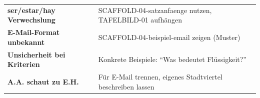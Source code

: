 \documentclass[11pt, a4paper]{article}
\begin{document}
\begin{tcolorbox}[
    colback=white,
    colframe=spanisch,
    title={\footnotesize\bfseries Erwartete Schwierigkeiten},
    fonttitle=\bfseries,
    boxrule=0.5pt,
    top=2pt, bottom=2pt, left=4pt, right=4pt
]
\footnotesize
\begin{tabularx}{\textwidth}{@{}p{4cm}X@{}}
\textbf{ser/estar/hay Verwechslung} & SCAFFOLD-04-satzanfaenge nutzen, TAFELBILD-01 aufhängen \\
\textbf{E-Mail-Format unbekannt} & SCAFFOLD-04-beispiel-email zeigen (Muster) \\
\textbf{Unsicherheit bei Kriterien} & Konkrete Beispiele: ``Was bedeutet Flüssigkeit?'' \\
\textbf{A.A. schaut zu E.H.} & Für E-Mail trennen, eigenes Stadtviertel beschreiben lassen \\
\end{tabularx}
\end{tcolorbox}
\end{document}
